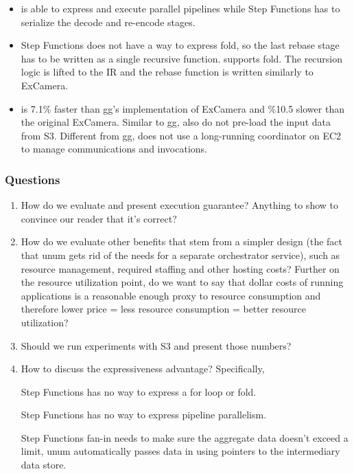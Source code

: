 \begin{itemize}

    \item \name{} is able to express and execute parallel pipelines while Step
    Functions has to serialize the decode and re-encode stages.

    \item Step Functions does not have a way to express fold, so the last
    rebase stage has to be written as a single recursive function. \name{}
    supports fold. The recursion logic is lifted to the \name{} IR and the
    rebase function is written similarly to ExCamera.

    \item \name{} is 7.1\% faster than gg's implementation of ExCamera and
    \%10.5 slower than the original ExCamera. Similar to gg, \name{} also do
    not pre-load the input data from S3. Different from gg, \name{} does not
    use a long-running coordinator on EC2 to manage communications and
    invocations.

\end{itemize}

\subsubsection{Questions}

\begin{enumerate}

    \item How do we evaluate and present execution guarantee? Anything to show
     to convince our reader that it's correct?

    \item How do we evaluate other benefits that stem from a simpler design
     (the fact that unum gets rid of the needs for a separate orchestrator
     service), such as resource management, required staffing and other
     hosting costs? Further on the resource utilization point, do we want to
     say that dollar costs of running applications is a reasonable enough
     proxy to resource consumption and therefore lower price = less resource
     consumption = better resource utilization?

    \item Should we run experiments with S3 and present those numbers?

    \item How to discuss the expressiveness advantage? Specifically,

        Step Functions has no way to express a for loop or fold.

        Step Functions has no way to express pipeline parallelism.

        Step Functions fan-in needs to make sure the aggregate data doesn't exceed a
        limit, unum automatically passes data in using pointers to the intermediary
        data store.

\end{enumerate}

